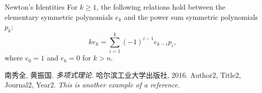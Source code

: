 \documentclass[11pt]{elegantbook}
\begin{document}
\begin{theorem}{Newton's Identities}
    For \( k \geq 1 \), the following relations hold between the elementary symmetric polynomials \( e_k \) 
    and the power sum symmetric polynomials \( p_k \):
    \[
    k e_k = \sum_{i=1}^{k} (-1)^{i-1} e_{k-i} p_i,
    \]
    where \( e_0 = 1 \) and \( e_k = 0 \) for \( k > n \).
\end{theorem}


\begin{thebibliography}{99}
 南秀全, 黄振国. \emph{多项式理论}. 哈尔滨工业大学出版社, 2016.
 Author2, Title2, Journal2, Year2. \emph{ This is another example of a reference.}
\end{thebibliography}
\end{document}
